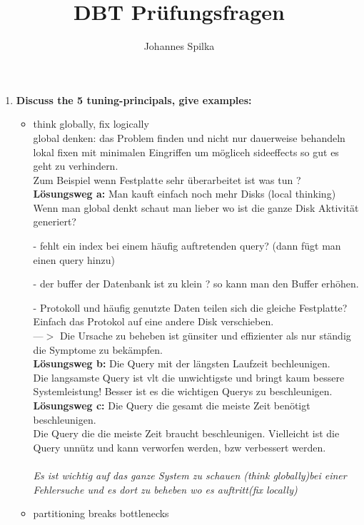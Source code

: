 \documentclass[12pt]{article}\pagestyle{myheadings}
\title{DBT Prüfungsfragen}
\author{Johannes Spilka}
\theoremstyle{plain}
\begin{document}
\maketitle
\begin{enumerate}

\item \textbf{Discuss the 5 tuning-principals, give examples:} \\
\begin{itemize}
\item think globally, fix logically\\
global denken: das Problem finden und nicht nur dauerweise behandeln\\
lokal fixen mit minimalen Eingriffen um mögliceh sideeffects so gut es geht zu verhindern.\\
Zum Beispiel wenn Festplatte sehr überarbeitet ist was tun ?
\textbf{Lösungsweg a:} Man kauft einfach noch mehr Disks (local thinking)\\
Wenn man global denkt schaut man lieber wo ist die ganze Disk Aktivität generiert?\\
\item[-]fehlt ein index bei einem häufig auftretenden query? (dann fügt man einen query hinzu)
\item[-]der buffer der Datenbank ist zu klein ? so kann man den Buffer erhöhen.
\item[-]Protokoll und häufig genutzte Daten teilen sich die gleiche Festplatte? Einfach das Protokol auf eine andere Disk verschieben.\\
---$>$ Die Ursache zu beheben ist günsiter und effizienter als nur ständig die Symptome zu bekämpfen.\\
\textbf{Lösungsweg b:} Die Query mit der längsten Laufzeit bechleunigen.\\
Die langsamste Query ist vlt die unwichtigste und bringt kaum bessere Systemleistung! Besser ist es die wichtigen Querys zu beschleunigen.\\
\textbf{Lösungsweg c:} Die Query die gesamt die meiste Zeit benötigt beschleunigen.\\Die Query die die meiste Zeit braucht beschleunigen.
Vielleicht ist die Query unnütz und kann verworfen werden, bzw verbessert werden.\\ \\
\textit{Es ist wichtig auf das ganze System zu schauen (think globally)bei einer Fehlersuche und es dort zu beheben wo es auftritt(fix locally)}
\item partitioning breaks bottlenecks \\

\end{itemize}
\end{enumerate}
\end{document}
